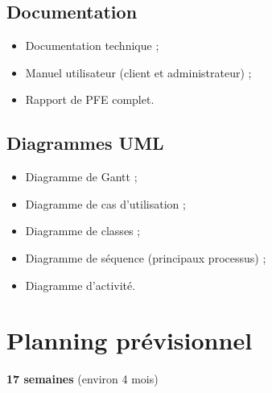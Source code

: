 \documentclass[12pt,a4paper]{report}
\begin{document}
\section{Documentation}

\begin{itemize}
  \item Documentation technique ;
  \item Manuel utilisateur (client et administrateur) ;
  \item Rapport de PFE complet.
\end{itemize}

\section{Diagrammes UML}

\begin{itemize}
  \item Diagramme de Gantt ;
  \item Diagramme de cas d'utilisation ;
  \item Diagramme de classes ;
  \item Diagramme de séquence (principaux processus) ;
  \item Diagramme d'activité.
\end{itemize}

\chapter{Planning prévisionnel}

\begin{infobox}
  \centering
  \large \textbf{17 semaines} (environ 4 mois)
\end{infobox}

\vspace{0.5cm}
\end{document}
